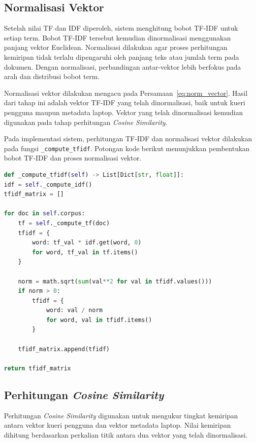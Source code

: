 \subsection{Normalisasi Vektor}
Setelah nilai TF dan IDF diperoleh, sistem menghitung bobot TF-IDF untuk setiap term. Bobot TF-IDF tersebut kemudian dinormalisasi menggunakan panjang vektor Euclidean. Normalisasi dilakukan agar proses perhitungan kemiripan tidak terlalu dipengaruhi oleh panjang teks atau jumlah term pada dokumen. Dengan normalisasi, perbandingan antar-vektor lebih berfokus pada arah dan distribusi bobot term.

Normalisasi vektor dilakukan mengacu pada Persamaan~\ref{eq:norm_vector}. Hasil dari tahap ini adalah vektor TF-IDF yang telah dinormalisasi, baik untuk kueri pengguna maupun metadata laptop. Vektor yang telah dinormalisasi kemudian digunakan pada tahap perhitungan \textit{Cosine Similarity}.

Pada implementasi sistem, perhitungan TF-IDF dan normalisasi vektor dilakukan pada fungsi \texttt{\_compute\_tfidf}. Potongan kode berikut menunjukkan pembentukan bobot TF-IDF dan proses normalisasi vektor.

\begin{lstlisting}[basicstyle=\linespread{0.8}\ttfamily\footnotesize, language=Python, breaklines=true, caption={Potongan Kode Perhitungan TF-IDF dan Normalisasi Vektor}, label=kode:tfidf_normalisasi]
def _compute_tfidf(self) -> List[Dict[str, float]]:
idf = self._compute_idf()
tfidf_matrix = []

for doc in self.corpus:
    tf = self._compute_tf(doc)
    tfidf = {
        word: tf_val * idf.get(word, 0)
        for word, tf_val in tf.items()
    }
    
    norm = math.sqrt(sum(val**2 for val in tfidf.values()))
    if norm > 0:
        tfidf = {
            word: val / norm
            for word, val in tfidf.items()
        }

    tfidf_matrix.append(tfidf)

return tfidf_matrix
\end{lstlisting}

\subsection{Perhitungan \textit{Cosine Similarity}}
Perhitungan \textit{Cosine Similarity} digunakan untuk mengukur tingkat kemiripan antara vektor kueri pengguna dan vektor metadata laptop. Nilai kemiripan dihitung berdasarkan perkalian titik antara dua vektor yang telah dinormalisasi.

